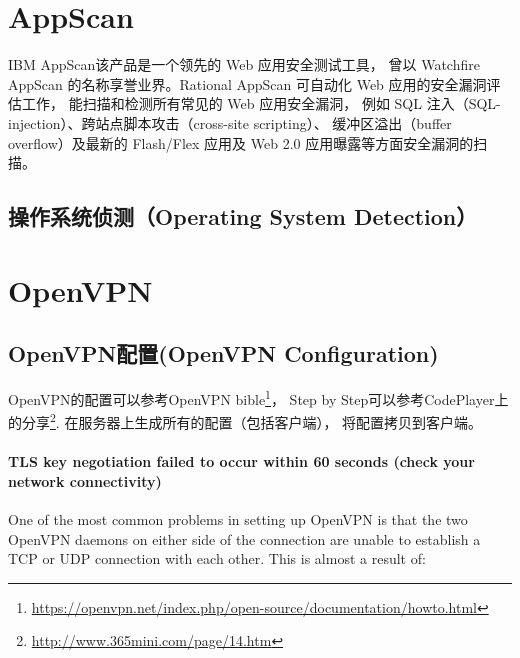 \documentclass{book}
\begin{document}
\section{AppScan}

IBM AppScan该产品是一个领先的 Web 应用安全测试工具，
曾以 Watchfire AppScan 的名称享誉业界。Rational AppScan 可自动化 Web 应用的安全漏洞评估工作，
能扫描和检测所有常见的 Web 应用安全漏洞，
例如 SQL 注入（SQL-injection）、跨站点脚本攻击（cross-site scripting）、
缓冲区溢出（buffer overflow）及最新的 Flash/Flex 应用及 Web 2.0 应用曝露等方面安全漏洞的扫描。


\subsection{操作系统侦测（Operating System Detection）}

\section{OpenVPN}





\subsection{OpenVPN配置(OpenVPN Configuration)}

OpenVPN的配置可以参考OpenVPN bible\footnote{\url{https://openvpn.net/index.php/open-source/documentation/howto.html}}，
Step by Step可以参考CodePlayer上的分享\footnote{\url{http://www.365mini.com/page/14.htm}}.
在服务器上生成所有的配置（包括客户端），
将配置拷贝到客户端。


\paragraph{TLS key negotiation failed to occur within 60 seconds (check your network connectivity)}

One of the most common problems in setting up OpenVPN is that the two OpenVPN daemons on either side of the connection are unable to establish a TCP or UDP connection with each other.
This is almost a result of:
\end{document}
